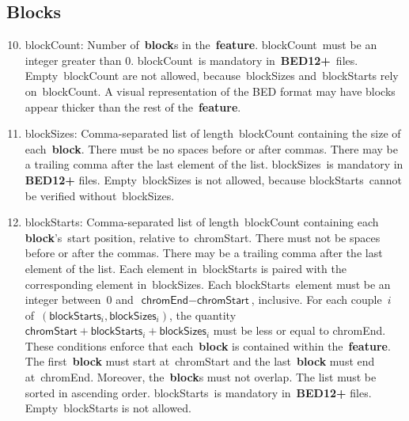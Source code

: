 \documentclass[11pt]{article}
\begin{document}
\subsection{Blocks}
\begin{enumerate}
  \setcounter{enumi}{9}
  
\item \textsf{blockCount}: Number of~\textbf{block}s in the~\textbf{feature}.
  \textsf{blockCount}~must be an integer greater than 0.
  \textsf{blockCount}~is mandatory in~\textbf{BED12+}~files.
  Empty~\textsf{blockCount} are not allowed, because~\textsf{blockSizes} and~\textsf{blockStarts} rely on~\textsf{blockCount}.
  A visual representation of the \ac{BED} format may have blocks appear thicker than the rest of the~\textbf{feature}.

\item \textsf{blockSizes}: Comma-separated list of length~\textsf{blockCount} containing the size of each~\textbf{block}.
  There must be no spaces before or after commas.
  There may be a trailing comma after the last element of the list.
  \textsf{blockSizes}~is mandatory in \textbf{BED12+} files.
  Empty~\textsf{blockSizes} is not allowed, because \textsf{blockStarts}~cannot be verified without~\textsf{blockSizes}.

\item \textsf{blockStarts}: Comma-separated list of length~\textsf{blockCount} containing each \textbf{block}'s~start position, relative to~\textsf{chromStart}.
  There must not be spaces before or after the commas.
  There may be a trailing comma after the last element of the list.
  Each element in~\textsf{blockStarts} is paired with the corresponding element in~\textsf{blockSizes}.
  Each \textsf{blockStarts}~element must be an integer between~0 and~$\textsf{chromEnd} - \textsf{chromStart}$, inclusive.
  For each couple~$i$ of~$(\textsf{blockStarts}_i, \textsf{blockSizes}_i)$, the quantity~$\textsf{chromStart} + \textsf{blockStarts}_i + \textsf{blockSizes}_i$ must be less or equal to \textsf{chromEnd}.
  These conditions enforce that each~\textbf{block} is contained within the~\textbf{feature}.
  The first~\textbf{block} must start at~\textsf{chromStart} and the last~\textbf{block} must end at~\textsf{chromEnd}.
  Moreover, the~\textbf{block}s must not overlap.
  The list must be sorted in ascending order.
  \textsf{blockStarts}~is mandatory in~\textbf{BED12+} files.
  Empty~\textsf{blockStarts} is not allowed.
\end{enumerate}
\end{document}
